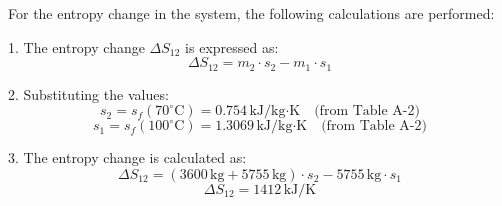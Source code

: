 For the entropy change in the system, the following calculations are performed:

1. The entropy change \( \Delta S_{12} \) is expressed as:  
\[
\Delta S_{12} = m_2 \cdot s_2 - m_1 \cdot s_1
\]

2. Substituting the values:  
\[
s_2 = s_f(70^\circ\text{C}) = 0.754 \, \text{kJ/kg·K} \quad \text{(from Table A-2)}
\]
\[
s_1 = s_f(100^\circ\text{C}) = 1.3069 \, \text{kJ/kg·K} \quad \text{(from Table A-2)}
\]

3. The entropy change is calculated as:  
\[
\Delta S_{12} = (3600 \, \text{kg} + 5755 \, \text{kg}) \cdot s_2 - 5755 \, \text{kg} \cdot s_1
\]
\[
\Delta S_{12} = 1412 \, \text{kJ/K}
\]
